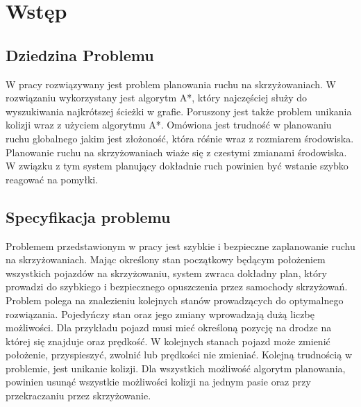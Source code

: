 \chapter{Wstęp}

\section{Dziedzina Problemu}

W pracy rozwiązywany jest problem planowania ruchu na skrzyżowaniach.
\newline
\newline
W rozwiązaniu wykorzystany jest algorytm A*, który najczęściej służy do wyszukiwania najkrótszej ścieżki w grafie.
\newline
\newline
Poruszony jest także problem unikania kolizji wraz z użyciem algorytmu A*.
\newline
\newline
Omówiona jest trudność w planowaniu ruchu globalnego jakim jest złożoność, która róśnie wraz z rozmiarem środowiska.
\newline
\newline
Planowanie ruchu na skrzyżowaniach wiaże się z czestymi zmianami środowiska. W związku z tym system planujący dokładnie ruch powinien być wstanie szybko reagować na pomyłki.

\section{Specyfikacja problemu}

Problemem przedstawionym w pracy jest szybkie i bezpieczne zaplanowanie ruchu na skrzyżowaniach. 
\newline
\newline
Mając określony stan początkowy będącym położeniem wszystkich pojazdów na skrzyżowaniu, system zwraca dokładny plan, który prowadzi do szybkiego i bezpiecznego opuszczenia przez samochody skrzyżowań.
\newline
\newline
Problem polega na znalezieniu kolejnych stanów prowadzących do optymalnego rozwiązania. Pojedyńczy stan oraz jego zmiany wprowadzają dużą liczbę możliwości.
\newline
\newline
Dla przykładu pojazd musi mieć określoną pozycję na drodze na której się znajduje oraz prędkość. W kolejnych stanach pojazd może zmienić położenie, przyspieszyć, zwolnić lub prędkości nie zmieniać.
\newline
\newline
Kolejną trudnością w problemie, jest unikanie kolizji. Dla wszystkich możliwość algorytm planowania, powinien usunąć wszystkie możliwości kolizji na jednym pasie oraz przy przekraczaniu przez skrzyżowanie.

